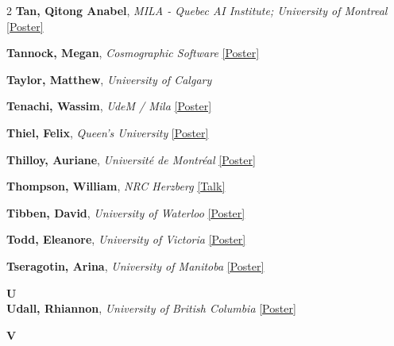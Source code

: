 \begin{small}
\begin{multicols}{2}
\textbf{Tan, Qitong Anabel}, {\footnotesize\textit{MILA - Quebec AI Institute; University of Montreal}} \hyperref[poster-abstract-page-talk-336]{\scriptsize\textcolor{cascateal}{[Poster]}}\par
\textbf{Tannock, Megan}, {\footnotesize\textit{Cosmographic Software}} \hyperref[poster-abstract-page-talk-133]{\scriptsize\textcolor{cascateal}{[Poster]}}\par
\textbf{Taylor, Matthew}, {\footnotesize\textit{University of Calgary}}\par
\textbf{Tenachi, Wassim}, {\footnotesize\textit{UdeM / Mila}} \hyperref[poster-abstract-page-talk-275]{\scriptsize\textcolor{cascateal}{[Poster]}}\par
\textbf{Thiel, Felix}, {\footnotesize\textit{Queen's University}} \hyperref[poster-abstract-page-talk-64]{\scriptsize\textcolor{cascateal}{[Poster]}}\par
\textbf{Thilloy, Auriane}, {\footnotesize\textit{Université de Montréal}} \hyperref[poster-abstract-page-talk-85]{\scriptsize\textcolor{cascateal}{[Poster]}}\par
\textbf{Thompson, William}, {\footnotesize\textit{NRC Herzberg}} \hyperref[abstract-page-talk-284]{\scriptsize\textcolor{cascablue}{[Talk]}}\par
\textbf{Tibben, David}, {\footnotesize\textit{University of Waterloo}} \hyperref[poster-abstract-page-talk-245]{\scriptsize\textcolor{cascateal}{[Poster]}}\par
\textbf{Todd, Eleanore}, {\footnotesize\textit{University of Victoria}} \hyperref[poster-abstract-page-talk-61]{\scriptsize\textcolor{cascateal}{[Poster]}}\par
\textbf{Tseragotin, Arina}, {\footnotesize\textit{University of Manitoba}} \hyperref[poster-abstract-page-talk-242]{\scriptsize\textcolor{cascateal}{[Poster]}}\par

{\sffamily\bfseries\color{cascablue}\large U}\\[2pt]

\textbf{Udall, Rhiannon}, {\footnotesize\textit{University of British Columbia}} \hyperref[poster-abstract-page-talk-84]{\scriptsize\textcolor{cascateal}{[Poster]}}\par

{\sffamily\bfseries\color{cascablue}\large V}\\[2pt]


\end{multicols}
\end{small}
